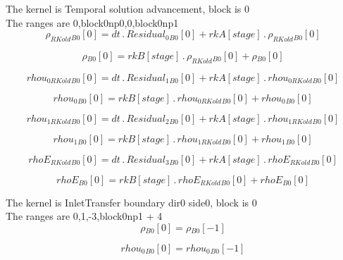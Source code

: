 \documentclass{article}
\begin{document}
\noindent The kernel is Temporal solution advancement, block is 0\\\noindent The ranges are 0,block0np0,0,block0np1\\\begin{dmath}{\rho_{RKold}{_{B0}}}[{0}] = dt \,.\, {Residual_{0}{_{B0}}}[{0}] + {rkA}[{stage}] \,.\, {\rho_{RKold}{_{B0}}}[{0}]\end{dmath}

\begin{dmath}{\rho{_{B0}}}[{0}] = {rkB}[{stage}] \,.\, {\rho_{RKold}{_{B0}}}[{0}] + {\rho{_{B0}}}[{0}]\end{dmath}

\begin{dmath}{rhou_{0 RKold}{_{B0}}}[{0}] = dt \,.\, {Residual_{1}{_{B0}}}[{0}] + {rkA}[{stage}] \,.\, {rhou_{0 RKold}{_{B0}}}[{0}]\end{dmath}

\begin{dmath}{rhou_{0}{_{B0}}}[{0}] = {rkB}[{stage}] \,.\, {rhou_{0 RKold}{_{B0}}}[{0}] + {rhou_{0}{_{B0}}}[{0}]\end{dmath}

\begin{dmath}{rhou_{1 RKold}{_{B0}}}[{0}] = dt \,.\, {Residual_{2}{_{B0}}}[{0}] + {rkA}[{stage}] \,.\, {rhou_{1 RKold}{_{B0}}}[{0}]\end{dmath}

\begin{dmath}{rhou_{1}{_{B0}}}[{0}] = {rkB}[{stage}] \,.\, {rhou_{1 RKold}{_{B0}}}[{0}] + {rhou_{1}{_{B0}}}[{0}]\end{dmath}

\begin{dmath}{rhoE_{RKold}{_{B0}}}[{0}] = dt \,.\, {Residual_{3}{_{B0}}}[{0}] + {rkA}[{stage}] \,.\, {rhoE_{RKold}{_{B0}}}[{0}]\end{dmath}

\begin{dmath}{rhoE{_{B0}}}[{0}] = {rkB}[{stage}] \,.\, {rhoE_{RKold}{_{B0}}}[{0}] + {rhoE{_{B0}}}[{0}]\end{dmath}

\noindent The kernel is InletTransfer boundary dir0 side0, block is 0\\\noindent The ranges are 0,1,-3,block0np1 + 4\\\begin{dmath}{\rho{_{B0}}}[{0}] = {\rho{_{B0}}}[{-1}]\end{dmath}

\begin{dmath}{rhou_{0}{_{B0}}}[{0}] = {rhou_{0}{_{B0}}}[{-1}]\end{dmath}
\end{document}
